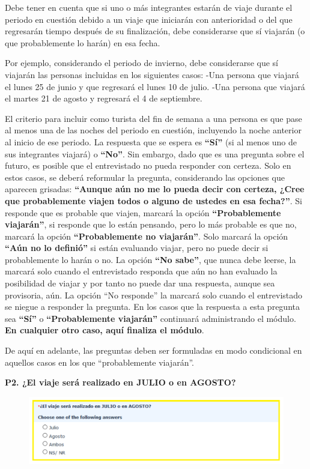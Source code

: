 \documentclass[
  openany]{book}
\begin{document}
Debe tener en cuenta que si uno o más integrantes estarán de viaje durante el periodo en cuestión debido a un viaje que iniciarán con anterioridad o del que regresarán tiempo después de su finalización, debe considerarse que sí viajarán (o que probablemente lo harán) en esa fecha.

Por ejemplo, considerando el periodo de invierno, debe considerarse que sí viajarán las personas incluidas en los siguientes casos: -Una persona que viajará el lunes 25 de junio y que regresará el lunes 10 de julio. -Una persona que viajará el martes 21 de agosto y regresará el 4 de septiembre.

El criterio para incluir como turista del fin de semana a una persona es que pase al menos una de las noches del periodo en cuestión, incluyendo la noche anterior al inicio de ese periodo. La respuesta que se espera es \textbf{``Sí''} (si al menos uno de sus integrantes viajará) o \textbf{``No''}. Sin embargo, dado que es una pregunta sobre el futuro, es posible que el entrevistado no pueda responder con certeza. Solo en estos casos, se deberá reformular la pregunta, considerando las opciones que aparecen grisadas: \textbf{``Aunque aún no me lo pueda decir con certeza, ¿Cree que probablemente viajen todos o alguno de ustedes en esa fecha?''}. Si responde que es probable que viajen, marcará la opción \textbf{``Probablemente viajarán''}, si responde que lo están pensando, pero lo más probable es que no, marcará la opción \textbf{``Probablemente no viajarán''}. Solo marcará la opción \textbf{``Aún no lo definió''} si están evaluando viajar, pero no puede decir si probablemente lo harán o no. La opción \textbf{``No sabe''}, que nunca debe leerse, la marcará solo cuando el entrevistado responda que aún no han evaluado la posibilidad de viajar y por tanto no puede dar una respuesta, aunque sea provisoria, aún. La opción ``No responde'' la marcará solo cuando el entrevistado se niegue a responder la pregunta. En los casos que la respuesta a esta pregunta sea \textbf{``Sí''} o \textbf{``Probablemente viajarán''} continuará administrando el módulo. \textbf{En cualquier otro caso, aquí finaliza el módulo}.

De aquí en adelante, las preguntas deben ser formuladas en modo condicional en aquellos casos en los que ``probablemente viajarán''.

\textbf{P2. ¿El viaje será realizado en JULIO o en AGOSTO?}

\begin{figure}

{\centering \includegraphics[width=1\linewidth]{imagenes/figura6-129} 

}

\end{figure}
\end{document}
